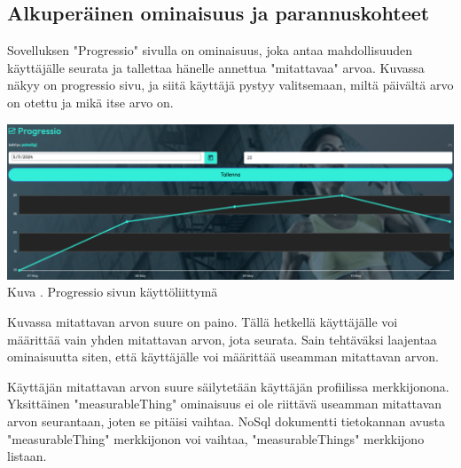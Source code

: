 

\subsection{Alkuperäinen ominaisuus ja parannuskohteet}





Sovelluksen "Progressio"{} sivulla on ominaisuus, 
joka antaa mahdollisuuden käyttäjälle seurata ja tallettaa hänelle annettua "mitattavaa"{} arvoa.
Kuvassa \nextImageCount {} näkyy on progressio sivu, 
ja siitä käyttäjä pystyy valitsemaan, miltä päivältä arvo on otettu ja mikä itse arvo on.
\medskip

\bigskip
\includegraphics[width =15cm]{src/public/progressiosingle.png}\\
Kuva \getImgCount {}. Progressio sivun käyttöliittymä 
\medskip



Kuvassa \theimgCounter {} mitattavan arvon suure on paino. 
% 
Tällä hetkellä käyttäjälle voi määrittää vain yhden mitattavan arvon, jota seurata.
Sain tehtäväksi laajentaa ominaisuutta siten, että käyttäjälle voi määrittää useamman mitattavan arvon.
\medskip


Käyttäjän mitattavan arvon suure säilytetään käyttäjän profiilissa merkkijonona. 
Yksittäinen "measurableThing"{} ominaisuus ei ole riittävä useamman mitattavan arvon seurantaan, joten se pitäisi vaihtaa.
%
NoSql dokumentti tietokannan avusta "measurableThing"{} merkkijonon voi vaihtaa, "measurableThings"{} merkkijono listaan.
\medskip






